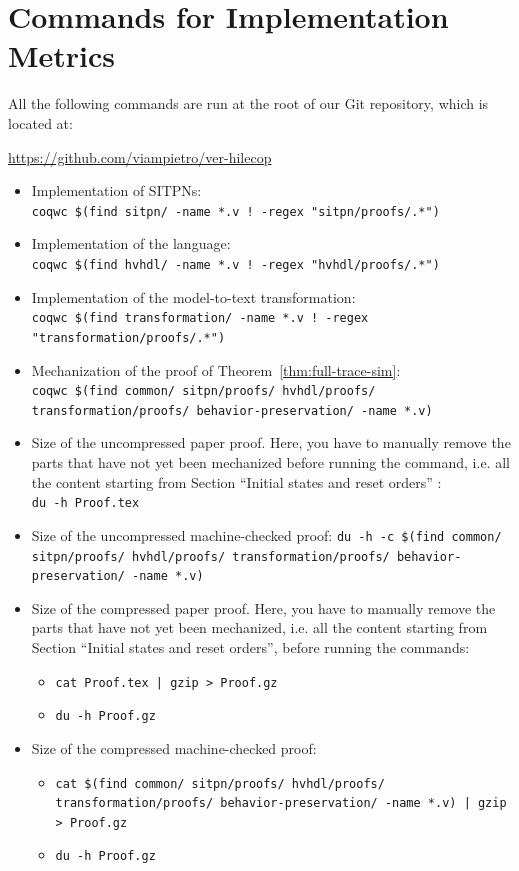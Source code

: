 \documentclass[pdflatex,sn-mathphys]{sn-jnl}%
\theoremstyle{thmstyleone}%
\theoremstyle{thmstyletwo}%
\theoremstyle{thmstylethree}%
\begin{document}
\section{Commands for Implementation Metrics}
\label{app:impl-metrics}

All the following commands are run at the root of our \textsf{Git}
repository, which is located at:

\begin{center}
  \url{https://github.com/viampietro/ver-hilecop}
\end{center}

\bigskip

\begin{itemize}
\item Implementation of SITPNs: \\
  \texttt{coqwc \$(find sitpn/ -name *.v ! -regex "sitpn/proofs/.*")}
\item Implementation of the \hvhdl{} language:\\
  \texttt{coqwc \$(find hvhdl/ -name *.v ! -regex "hvhdl/proofs/.*")}
\item Implementation of the \hilecop{} model-to-text transformation: \\
  \texttt{coqwc \$(find transformation/ -name *.v ! -regex "transformation/proofs/.*")}
\item Mechanization of the proof of Theorem~\ref{thm:full-trace-sim}: \\
  \texttt{coqwc \$(find common/ sitpn/proofs/ hvhdl/proofs/ transformation/proofs/ behavior-preservation/ -name *.v)}
\item Size of the uncompressed paper proof. Here, you have to manually remove the parts that have not yet been mechanized before running the command, i.e. all the content starting from Section ``Initial states and reset orders'' :\\
  \texttt{du -h Proof.tex}
\item Size of the uncompressed machine-checked proof:
  \texttt{du -h -c \$(find common/ sitpn/proofs/ hvhdl/proofs/ transformation/proofs/ behavior-preservation/ -name *.v)}
\item Size of the compressed paper proof. Here, you have to manually
  remove the parts that have not yet been mechanized, i.e. all the
  content starting from Section ``Initial states and reset orders'',
  before running the commands:
  \begin{itemize}
  \item \texttt{cat Proof.tex | gzip > Proof.gz}
  \item \texttt{du -h Proof.gz}
  \end{itemize}
\item Size of the compressed machine-checked proof:
  \begin{itemize}
  \item \texttt{cat \$(find common/ sitpn/proofs/ hvhdl/proofs/ transformation/proofs/ behavior-preservation/ -name *.v) | gzip > Proof.gz}
  \item \texttt{du -h Proof.gz}
  \end{itemize}
\end{itemize}


\end{document}
